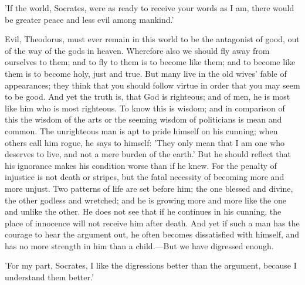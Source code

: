 \documentclass[11pt,letter]{article}
\begin{document}
\par  'If the world, Socrates, were as ready to receive your words as I am, there would be greater peace and less evil among mankind.'

\par  Evil, Theodorus, must ever remain in this world to be the antagonist of good, out of the way of the gods in heaven. Wherefore also we should fly away from ourselves to them; and to fly to them is to become like them; and to become like them is to become holy, just and true. But many live in the old wives' fable of appearances; they think that you should follow virtue in order that you may seem to be good. And yet the truth is, that God is righteous; and of men, he is most like him who is most righteous. To know this is wisdom; and in comparison of this the wisdom of the arts or the seeming wisdom of politicians is mean and common. The unrighteous man is apt to pride himself on his cunning; when others call him rogue, he says to himself: 'They only mean that I am one who deserves to live, and not a mere burden of the earth.' But he should reflect that his ignorance makes his condition worse than if he knew. For the penalty of injustice is not death or stripes, but the fatal necessity of becoming more and more unjust. Two patterns of life are set before him; the one blessed and divine, the other godless and wretched; and he is growing more and more like the one and unlike the other. He does not see that if he continues in his cunning, the place of innocence will not receive him after death. And yet if such a man has the courage to hear the argument out, he often becomes dissatisfied with himself, and has no more strength in him than a child.—But we have digressed enough.

\par  'For my part, Socrates, I like the digressions better than the argument, because I understand them better.'
\end{document}
